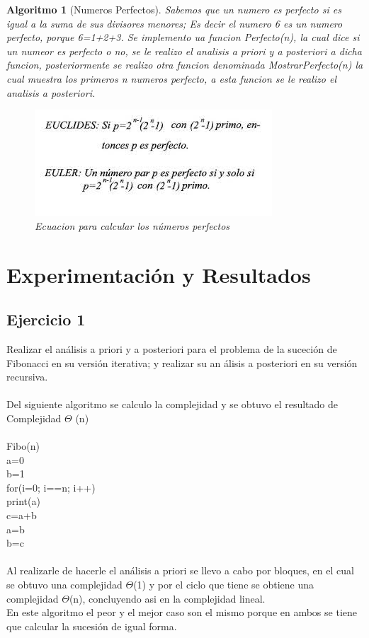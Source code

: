 \documentclass[12pt,twoside]{article}
\newtheorem{algoritmo}{Algoritmo}
\begin{document}
\begin{algoritmo}[Numeros Perfectos]
Sabemos que un numero es perfecto si es igual a la suma de sus divisores menores; Es decir el numero 6 es un numero perfecto, porque 6=1+2+3. Se implemento ua funcion Perfecto(n), la cual dice si un numeor es perfecto o no, se le realizo el analisis a priori y a posteriori a dicha funcion, posteriormente se realizo otra funcion denominada MostrarPerfecto(n) la cual muestra los primeros n numeros perfecto, a esta funcion se le realizo el analisis a posteriori. 

\begin{figure}[h!]
\centering
\includegraphics[scale=0.6]{perfectos.jpeg}
\caption{Ecuacion para calcular los números perfectos}
\label{fig:universe}
\end{figure}



\end{algoritmo}


 \section{Experimentaci\'on y Resultados}

\subsection{Ejercicio 1}
Realizar  el  análisis  a priori y  a posteriori para  el  problema  de la  suceción  de Fibonacci en su versión iterativa; y realizar su an álisis a posteriori en su versión recursiva.
\\
\\
Del siguiente algoritmo se calculo la complejidad y se obtuvo el resultado de Complejidad $\Theta$ (n)
\\
\\
Fibo(n)
\\
    a=0
\\
b=1
\\
for(i=0; i==n; i++)
\\
print(a)
\\
c=a+b
\\
a=b
\\
b=c
\\
\\
Al realizarle de hacerle el análisis a priori se llevo a cabo por bloques, en el cual se obtuvo una complejidad $\Theta$(1) y por el ciclo que tiene se obtiene una complejidad $\Theta$(n), concluyendo asi en la complejidad lineal.
\\
En este algoritmo el peor y el mejor caso son el mismo porque en ambos se tiene que calcular la sucesión de igual forma.
\newpage
\end{document}
